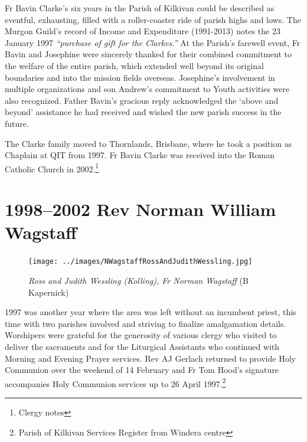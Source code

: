 Fr Bavin Clarke's six years in the Parish of Kilkivan could be described as eventful, exhausting, filled with a roller-coaster ride of parish highs and lows. The Murgon Guild's record of Income and Expenditure (1991-2013) notes the 23 January 1997 \emph{``purchase of gift for the Clarkes.''} At the Parish's farewell event, Fr Bavin and Josephine were sincerely thanked for their combined commitment to the welfare of the entire parish, which extended well beyond its original boundaries and into the mission fields overseas. Josephine's involvement in multiple organizations and son Andrew's commitment to Youth activities were also recognized. Father Bavin's gracious reply acknowledged the `above and beyond' assistance he had received and wished the new parish success in the future.



The Clarke family moved to Thornlands, Brisbane, where he took a position as Chaplain at QIT from 1997. Fr Bavin Clarke was received into the Roman Catholic Church in 2002.\footnote{Clergy notes}


\section{1998--2002 Rev Norman William Wagstaff}









\begin{figure}
\begin{center}
\texttt{[image: ../images/NWagstaffRossAndJudithWessling.jpg]}
\caption{{\itshape Ross and Judith Wessling (Kolling), Fr Norman Wagstaff } {\scriptsize(B Kapernick)}}
\end{center}
\end{figure}




1997 was another year where the area was left without an incumbent priest, this time with two parishes involved and striving to finalize amalgamation details. Worshipers were grateful for the generosity of various clergy who visited to deliver the sacraments and for the Liturgical Assistants who continued with Morning and Evening Prayer services. Rev AJ Gerlach returned to provide Holy Communion over the weekend of 14 February and Fr Tom Hood's signature accompanies Holy Communion services up to 26 April 1997.\footnote{Parish of Kilkivan Services Register from Windera centre}








